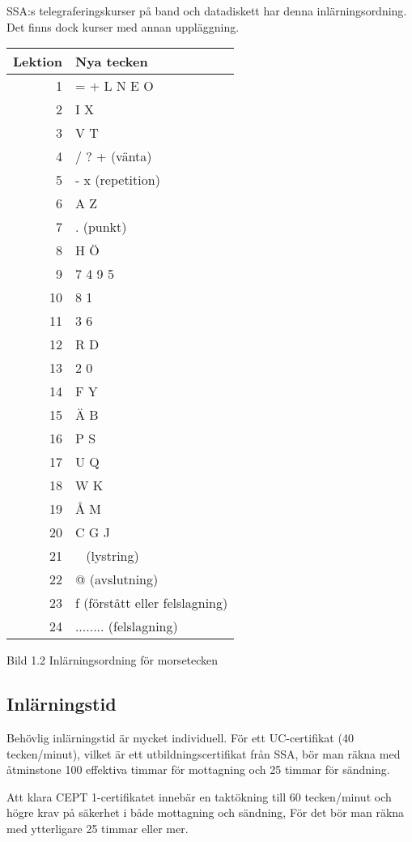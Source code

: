 SSA:s telegraferingskurser på band och datadiskett har denna inlärningsordning.
Det finns dock kurser med annan uppläggning.

\begin{center}
\begin{tabular}{|r|l|}
\hline
Lektion & Nya tecken \\ \hline
1 & = + L N E O \\
2 & I X \\
3 & V T \\
4 & / ? + (vänta) \\
5 & - x (repetition) \\
6 & A Z \\
7 & . (punkt) \\
8 & H Ö \\
9 & 7 4 9 5 \\
10 & 8 1 \\
11 & 3 6 \\
12 & R D \\
13 & 2 0 \\
14 & F Y \\
15 & Ä B \\
16 & P S \\
17 & U Q \\
18 & W K \\
19 & Å M \\
20 & C G J \\
21 & ~ (lystring) \\
22 & @ (avslutning) \\
23 & f (förstått eller felslagning) \\
24 & ........ (felslagning) \\
\hline
\end{tabular}
\end{center}

Bild 1.2 Inlärningsordning för morsetecken

\subsection{Inlärningstid}

Behövlig inlärningstid är mycket individuell. För ett UC-certifikat (40
tecken/minut), vilket är ett utbildningscertifikat från SSA, bör man räkna med
åtminstone 100 effektiva timmar för mottagning och 25 timmar för sändning.

Att klara CEPT 1-certifikatet innebär en taktökning till 60 tecken/minut och
högre krav på säkerhet i både mottagning och sändning, För det bör man räkna med
ytterligare 25 timmar eller mer.

